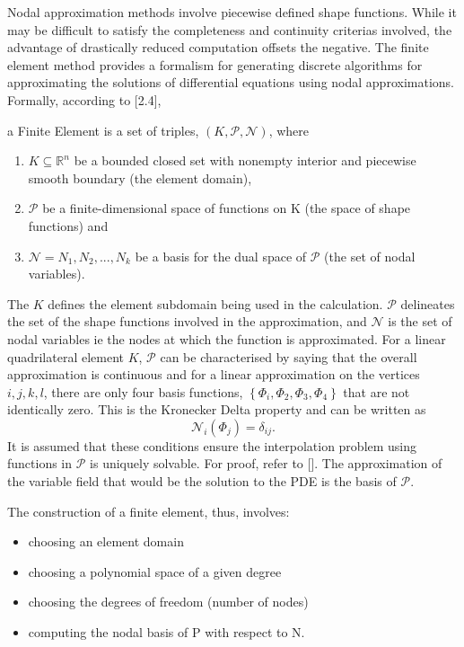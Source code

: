 \documentclass[../main.tex]{subfiles}
\begin{document}
 Nodal approximation methods involve piecewise defined shape functions. While it may be difficult to satisfy the
 completeness and continuity criterias involved, the advantage of drastically reduced computation offsets the negative.
The finite element method provides a formalism for generating discrete algorithms for approximating
 the solutions of differential equations using nodal approximations. 
 Formally, according to [2.4], 
\begin{definition}
    a Finite Element is a set of triples, $(K, \mathcal{P}, \mathcal{N})$, where
    \begin{enumerate}[i]
        \item $K \subseteq \mathbb{R}^{n}$ be a bounded closed set with nonempty interior and piecewise smooth boundary (the element domain),
        \item $\mathcal{P}$ be a finite-dimensional space of functions on K (the space of shape functions) and
        \item $\mathcal{N} = {N_{1}, N_{2},...,N_{k}}$ be a basis for the dual space of $\mathcal{P}$ (the set of nodal variables).
    \end{enumerate}
\end{definition}
%
The $K$ defines the element subdomain being used in the calculation. $\mathcal{P}$ delineates the set of
 the shape functions involved in the approximation, and $\mathcal{N}$ is the set of nodal variables ie the nodes at
 which the function is approximated. For a linear quadrilateral element $K$, $\mathcal{P}$ can be characterised by saying
 that the overall approximation is continuous and for a linear approximation on the vertices $i, j, k, l$,
 there are only four basis functions, $\left\{\Phi_{i}, \Phi_{2}, \Phi_{3}, \Phi_{4} \right\}$ that are not identically zero.
 This is the Kronecker Delta property and can be written as
 \begin{equation*}
    \mathcal{N}_{i}(\Phi_{j}) = \delta_{ij}.
 \end{equation*}
It is assumed that these conditions ensure the interpolation problem using functions in $\mathcal{P}$ is uniquely solvable.
 For proof, refer to []. The approximation of the variable field that would be the solution to the PDE is the basis of $\mathcal{P}$.
 
The construction of a finite element, thus, involves:
 \begin{itemize}
    \item choosing an element domain
    \item choosing a polynomial space of a given degree
    \item choosing the degrees of freedom (number of nodes)
    \item computing the nodal basis of P with respect to N.
 \end{itemize}
\end{document}
